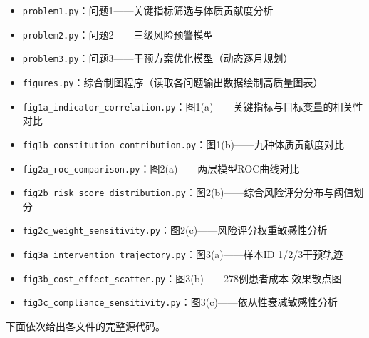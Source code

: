 \documentclass[a4paper,12pt]{ctexart}
\begin{document}
\begin{itemize}
    \item \texttt{problem1.py}：问题1——关键指标筛选与体质贡献度分析
    \item \texttt{problem2.py}：问题2——三级风险预警模型
    \item \texttt{problem3.py}：问题3——干预方案优化模型（动态逐月规划）
    \item \texttt{figures.py}：综合制图程序（读取各问题输出数据绘制高质量图表）
    \item \texttt{fig1a\_indicator\_correlation.py}：图1(a)——关键指标与目标变量的相关性对比
    \item \texttt{fig1b\_constitution\_contribution.py}：图1(b)——九种体质贡献度对比
    \item \texttt{fig2a\_roc\_comparison.py}：图2(a)——两层模型ROC曲线对比
    \item \texttt{fig2b\_risk\_score\_distribution.py}：图2(b)——综合风险评分分布与阈值划分
    \item \texttt{fig2c\_weight\_sensitivity.py}：图2(c)——风险评分权重敏感性分析
    \item \texttt{fig3a\_intervention\_trajectory.py}：图3(a)——样本ID 1/2/3干预轨迹
    \item \texttt{fig3b\_cost\_effect\_scatter.py}：图3(b)——278例患者成本-效果散点图
    \item \texttt{fig3c\_compliance\_sensitivity.py}：图3(c)——依从性衰减敏感性分析
\end{itemize}

下面依次给出各文件的完整源代码。














\end{document}
